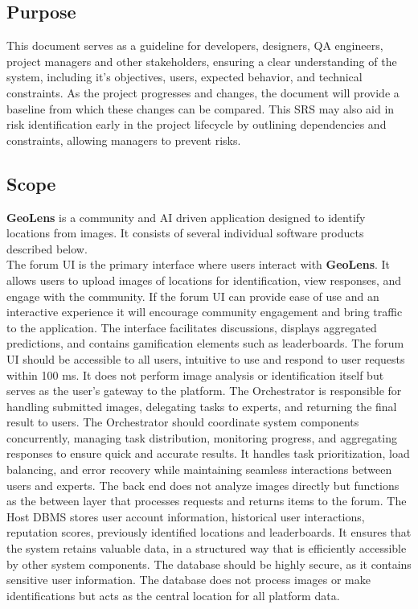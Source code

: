 \documentclass[]{article}
\begin{document}
\subsection{Purpose}
\label{sub:purpose}
This document serves as a guideline for developers, designers, QA engineers, project managers and other stakeholders, ensuring a clear understanding of the system, including it's objectives, users, expected behavior, and technical constraints.
As the project progresses and changes, the document will provide a baseline from which these changes can be compared. This SRS may also aid in risk identification early in the project lifecycle by outlining dependencies and constraints, allowing managers to prevent risks.

\subsection{Scope}
\label{sub:scope}
\textbf{GeoLens} is a community and AI driven application designed to identify locations from images. It consists of several individual software products described below.\\

The forum UI is the primary interface where users interact with \textbf{GeoLens}. It allows users to upload images of locations for identification, view responses, and
engage with the community. If the forum UI can provide ease of use and an interactive experience it will encourage community engagement and bring traffic to the
application. The interface facilitates discussions, displays aggregated predictions, and contains gamification elements such as leaderboards. The forum UI should be accessible
to all users, intuitive to use and respond to user requests within 100 ms. It does not perform image analysis or identification itself but serves as the user’s gateway to the platform. The Orchestrator is responsible for handling submitted images, delegating tasks to experts,
and returning the final result to users. The Orchestrator should coordinate system components concurrently, managing task distribution, monitoring progress, and aggregating responses to ensure quick and accurate results. It handles task prioritization, load balancing, and error recovery while maintaining seamless interactions between users and experts.
The back end does not analyze images directly but functions as the between layer that processes requests and returns items to the forum. The Host DBMS stores user account information, historical user interactions, reputation scores, previously identified locations and leaderboards. It ensures that the system retains valuable data,
in a structured way that is efficiently accessible by other system components. The database should be highly secure, as it contains sensitive user information. The database does not process images or make
identifications but acts as the central location for all platform data. \\
\end{document}
